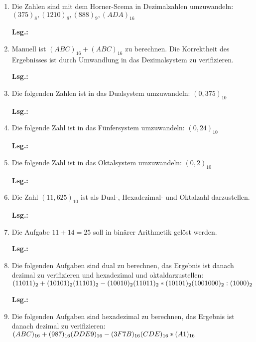 \documentclass[12pt,a4paper]{scrreprt}
\newcommand{\Lsg}{\par \textbf{Lsg.: \hfill }}
\begin{document}
\begin{enumerate}
\Lsg%

\item Die Zahlen sind mit dem Horner-Scema in Dezimalzahlen umzuwandeln: $(375)_8 , (1210)_8 , (888)_9 , (ADA)_{16}$

\Lsg%

\item Manuell ist $(ABC)_{16} + (ABC)_{16}$ zu berechnen. Die Korrektheit des Ergebnisses ist durch Umwandlung in das Dezimalsystem zu verifizieren.

\Lsg%

\item Die folgenden Zahlen ist in das Dualsystem umzuwandeln: $(0,375)_{10}$

\Lsg%

\item Die folgende Zahl ist in das Fünfersystem umzuwandeln: $(0,24)_{10}$

\Lsg%

\item Die folgende Zahl ist in das Oktalsystem umzuwandeln: $(0,2)_{10}$

\Lsg%

\item Die Zahl $(11,625)_{10}$ ist als Dual-, Hexadezimal- und Oktalzahl darzustellen.

\Lsg%

\item Die Aufgabe $11+14=25$ soll in binärer Arithmetik gelöst werden.

\Lsg%

\item Die folgenden Aufgaben sind dual zu berechnen, das Ergebnis ist danach dezimal zu verifizieren und hexadezimal und oktaldarzustellen: \\
\begin{math}
(11011)_2 + (10101)_2  \\
(11101)_2 - (10010)_2  \\
(11011)_2 * (10101)_2  \\
(1001000)_2 : (1000)_2
\end{math}

\Lsg%

\item Die folgenden Aufgaben sind hexadezimal zu berechnen, das Ergebnis ist danach dezimal zu verifizieren: \\
\begin{math}
(ABC)_{16} + (987)_{16}   \\
(DDE9)_{16} - (3F7B)_{16} \\
(CDE)_{16} * (A1)_{16}
\end{math}


\end{enumerate}
\end{document}
